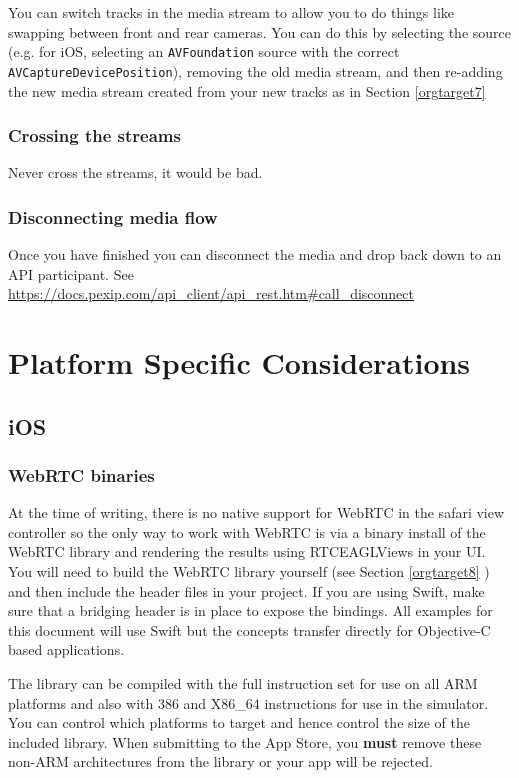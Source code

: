 \documentclass[a4paper,11pt]{article}
\begin{document}
You can switch tracks in the media stream to allow you to do things
like swapping between front and rear cameras.
You can do this by selecting the source (e.g. for iOS, selecting an
\texttt{AVFoundation} source with the correct \texttt{AVCaptureDevicePosition}),
removing the old media stream, and then re-adding the new media stream
created from your new tracks as in Section \ref{orgtarget7}

\subsubsection{Crossing the streams}
\label{sec:orgheadline29}

Never cross the streams, it would be bad.

\subsubsection{Disconnecting media flow}
\label{sec:orgheadline30}

Once you have finished you can disconnect the media and drop back down
to an API participant.  See
\url{https://docs.pexip.com/api_client/api_rest.htm#call_disconnect}

\section{Platform Specific Considerations}
\label{sec:orgheadline38}
\subsection{iOS}
\label{sec:orgheadline36}
\subsubsection{WebRTC binaries}
\label{sec:orgheadline33}

At the time of writing, there is no native support for WebRTC in the
safari view controller so the only way to work with WebRTC is via a
binary install of the WebRTC library and rendering the results
using RTCEAGLViews in your UI.  You will need to build the WebRTC
library yourself (see Section \ref{orgtarget8} ) and then include the
header files in your project.  If you are using Swift, make sure that
a bridging header is in place to expose the bindings.  All examples
for this document will use Swift but the concepts transfer directly
for Objective-C based applications.

The library can be compiled with the full instruction set for use on
all ARM platforms and also with 386 and X86\_64 instructions for use in
the simulator.  You can control which platforms to target and hence
control the size of the included library.  When submitting to the App
Store, you \textbf{must} remove these non-ARM architectures from the
library or your app will be rejected.
\end{document}
